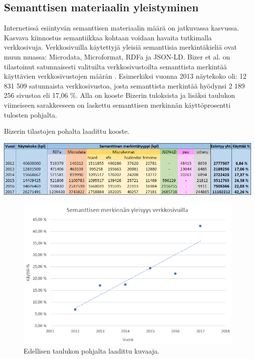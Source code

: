 \documentclass[finnish, 12pt, a4paper, elec, utf8, pdfa, online]{aaltothesis}
\begin{document}
{\subsection{Semanttisen materiaalin yleistyminen}
Internetissä esiintyvän semanttisen materiaalin määrä on jatkuvassa kasvussa. Kasvava kiinnostus semantiikkaa kohtaan voidaan havaita tutkimalla verkkosivuja. Verkkosivuilla käytettyjä yleisiä semanttisia merkintäkieliä ovat muun muassa: Microdata, Microformat, RDFa ja JSON-LD. Bizer et al. on tilastoinut satunnaisesti valituilta verkkosivustoilta semanttista merkintää käyttävien verkkosivustojen määrän \cite{rdfa_usage}. Esimerkiksi vuonna 2013 näytekoko oli: 12 831 509 satunnaista verkkosivustoa, josta semanttista merkintää hyödynsi 2 189 256 sivustoa eli 17,06 \%. Alla on kooste Bizerin tuloksista ja lisäksi taulukon viimeiseen sarakkeeseen on laskettu semanttisen merkinnän käyttöprosentti tulosten pohjalta.

\begin{table}[htb]
  \centering
  \caption{Bizerin tilastojen pohalta laadittu kooste. \label{images/taulukko2}}
  \includegraphics[width=15cm]{images/taulukko.png}
\end{table}


\begin{figure}[htb]
\centering
\includegraphics[width=13cm]{images/verkkosivut.png}
\caption{Edellisen taulukon pohjalta laadittu kuvaaja. \label{images/verkkosivut}}
\end{figure}

}
\end{document}
